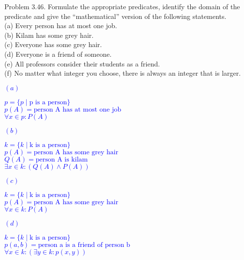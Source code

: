 \documentclass{article}
\begin{document}
\begin{addmargin}[2em]{2em}
	Problem 3.46. Formulate the appropriate predicates, identify the domain of the predicate and give the “mathematical” version of the following statements.\\
	 \indent (a) Every person has at most one job. \\
	 \indent (b) Kilam has some grey hair.\\
	 \indent (c) Everyone has some grey hair. \\
	 \indent (d) Everyone is a friend of someone. \\
	 \indent (e) All professors consider their students as a friend. \\
	 \indent (f) No matter what integer you choose, there is always an integer that is larger.\\
	 
	 \textcolor{blue}{
	 	$(a)$
	 	\begin{addmargin}[4em]{0em}
	 		 $p=\{p \mid \text{p is a person}\}$\\
	 		 $p(A) = \text{person A has at most one job}$\\
	 		 $\forall x \in p : P(A)$
	 	\end{addmargin}
	 }
 	
 	 \textcolor{blue}{
 		$(b)$
 		\begin{addmargin}[4em]{0em}
 			$k=\{k \mid \text{k is a person}\}$\\
 			$p(A) = \text{person A has some grey hair}$\\
 			$Q(A) = \text{person A is kilam}$\\
 			$\exists x \in k : (Q(A) \land P(A))$
 		\end{addmargin}
 	}
 
 	 \textcolor{blue}{
 		$(c)$
 		\begin{addmargin}[4em]{0em}
 			$k=\{k \mid \text{k is a person}\}$\\
 			$p(A) = \text{person A has some grey hair}$\\
 			$\forall x \in k : P(A)$
 		\end{addmargin}
 	}
 
 	 \textcolor{blue}{
 		$(d)$
 		\begin{addmargin}[4em]{0em}
 			$k=\{k \mid \text{k is a person}\}$\\
 			$p(a,b) = \text{person a is a friend of person b}$\\
 			$\forall x \in k :(\exists y \in k:p(x,y))$
 		\end{addmargin}
 	}
 	

\end{addmargin}
\end{document}
